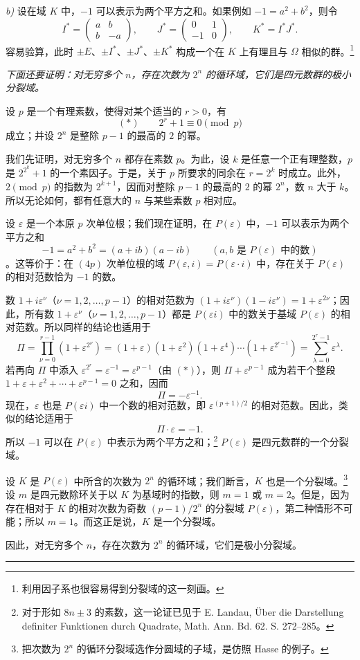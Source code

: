 \documentclass[11pt]{article}
\providecommand{\srcspaced}[1]{\emph{#1}}
\providecommand{\mat}[1]{\begin{pmatrix}#1\end{pmatrix}}
\begin{document}
\emph{b)} 设在域 $K$ 中，$-1$ 可以表示为两个平方之和。如果例如 $-1=a^2+b^2$，则令
\[
        I^*=\mat{a&b\\ b&-a},\qquad
        J^*=\mat{0&1\\-1&0},\qquad
        K^*=I^*J^*.
\]
容易验算，此时 $\pm E$、$\pm I^*$、$\pm J^*$、$\pm K^*$ 构成一个在 $K$ 上有理且与 $\Omega$ 相似的群。\footnote{利用因子系也很容易得到分裂域的这一刻画。}

\srcspaced{下面还要证明：对无穷多个 $n$，存在次数为 $2^n$ 的循环域，它们是四元数群的极小分裂域。}

设 $p$ 是一个有理素数，使得对某个适当的 $r>0$，有
\[
        (*)\qquad 2^r+1\equiv0\pmod p
\]
成立；并设 $2^n$ 是整除 $p-1$ 的最高的 $2$ 的幂。

我们先证明，对无穷多个 $n$ 都存在素数 $p$。为此，设 $k$ 是任意一个正有理整数，$p$ 是 $2^{2^k}+1$ 的一个素因子。于是，关于 $p$ 所要求的同余在 $r=2^k$ 时成立。此外，$2\pmod p$ 的指数为 $2^{k+1}$，因而对整除 $p-1$ 的最高的 $2$ 的幂 $2^n$，数 $n$ 大于 $k$。所以无论如何，都有任意大的 $n$ 与某些素数 $p$ 相对应。

设 $\varepsilon$ 是一个本原 $p$ 次单位根；我们现在证明，在 $P(\varepsilon)$ 中，$-1$ 可以表示为两个平方之和
\[
        -1=a^2+b^2=(a+ib)(a-ib)\qquad (a,b\text{ 是 }P(\varepsilon)\text{ 中的数})
\]
。这等价于：在 $(4p)$ 次单位根的域 $P(\varepsilon,i)=P(\varepsilon\cdot i)$ 中，存在关于 $P(\varepsilon)$ 的相对范数恰为 $-1$ 的数。

数 $1+i\varepsilon^\nu$（$\nu=1,2,\ldots,p-1$）的相对范数为 $(1+i\varepsilon^\nu)(1-i\varepsilon^\nu)=1+\varepsilon^{2\nu}$；因此，所有数 $1+\varepsilon^\nu$（$\nu=1,2,\ldots,p-1$）都是 $P(\varepsilon i)$ 中的数关于基域 $P(\varepsilon)$ 的相对范数。所以同样的结论也适用于
\[
\Pi=\prod_{\nu=0}^{r-1}(1+\varepsilon^{2^\nu})
=(1+\varepsilon)(1+\varepsilon^2)(1+\varepsilon^4)\cdots(1+\varepsilon^{2^{r-1}})
=\sum_{\lambda=0}^{2^r-1}\varepsilon^\lambda.
\]
若再向 $\Pi$ 中添入 $\varepsilon^{2^r}=\varepsilon^{-1}=\varepsilon^{p-1}$（由 $(*)$），则 $\Pi+\varepsilon^{p-1}$ 成为若干个整段 $1+\varepsilon+\varepsilon^2+\cdots+\varepsilon^{p-1}=0$ 之和，因而
\[
        \Pi=-\varepsilon^{-1}.
\]
现在，$\varepsilon$ 也是 $P(\varepsilon i)$ 中一个数的相对范数，即 $\varepsilon^{(p+1)/2}$ 的相对范数。因此，类似的结论适用于
\[
        \Pi\cdot\varepsilon=-1.
\]
所以 $-1$ 可以在 $P(\varepsilon)$ 中表示为两个平方之和；\footnote{对于形如 $8n\pm3$ 的素数，这一论证已见于 E. Landau, Über die Darstellung definiter Funktionen durch Quadrate, Math. Ann. Bd. 62. S. 272--285。} $P(\varepsilon)$ 是四元数群的一个分裂域。

设 $K$ 是 $P(\varepsilon)$ 中所含的次数为 $2^n$ 的循环域；我们断言，$K$ 也是一个分裂域。\footnote{把次数为 $2^n$ 的循环分裂域选作分圆域的子域，是仿照 Hasse 的例子。} 设 $m$ 是四元数除环关于以 $K$ 为基域时的指数，则 $m=1$ 或 $m=2$。但是，因为存在相对于 $K$ 的相对次数为奇数 $(p-1)/2^n$ 的分裂域 $P(\varepsilon)$，第二种情形不可能；所以 $m=1$。而这正是说，$K$ 是一个分裂域。

因此，对无穷多个 $n$，存在次数为 $2^n$ 的循环域，它们是极小分裂域。

\begin{center}
\rule{7em}{0.4pt}
\end{center}

\clearpage
\setcounter{footnote}{0}
\end{document}
